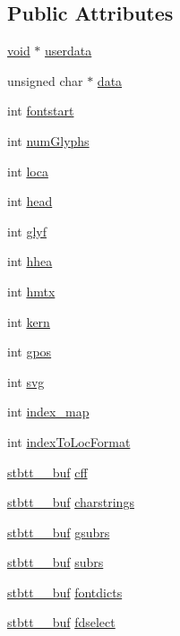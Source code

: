 \subsection*{Public Attributes}
\begin{DoxyCompactItemize}
\item 
\hyperlink{imgui__impl__opengl3__loader_8h_ac668e7cffd9e2e9cfee428b9b2f34fa7}{void} $\ast$ \hyperlink{structstbtt__fontinfo_a9c81078df96a7a3f730137151efab285}{userdata}
\item 
unsigned char $\ast$ \hyperlink{structstbtt__fontinfo_af348db379cf0e0e71a68603d00501d41}{data}
\item 
int \hyperlink{structstbtt__fontinfo_a139234d825b585afa27748a1f3d10c7d}{fontstart}
\item 
int \hyperlink{structstbtt__fontinfo_a60ad8301a98eb7cd91472ce846d9080d}{num\+Glyphs}
\item 
int \hyperlink{structstbtt__fontinfo_a15344195b181b50bde4f59ae7ca248c0}{loca}
\item 
int \hyperlink{structstbtt__fontinfo_ab76ed2f4cbd8fcbd8465ca5f88e7e2b9}{head}
\item 
int \hyperlink{structstbtt__fontinfo_a5de2129e0a415748920f6aa10ceee6e5}{glyf}
\item 
int \hyperlink{structstbtt__fontinfo_a91b82ae03d68892eb7f3fbd3a8b990e5}{hhea}
\item 
int \hyperlink{structstbtt__fontinfo_aebf42701e99b88d07a59bf99cb84b9a1}{hmtx}
\item 
int \hyperlink{structstbtt__fontinfo_a57cc83512daea60e97ed49354d634d37}{kern}
\item 
int \hyperlink{structstbtt__fontinfo_aeb6732549a55fa30235d0c0ecd743022}{gpos}
\item 
int \hyperlink{structstbtt__fontinfo_a2aae62e8e1269ab65be642a7ec82d7b3}{svg}
\item 
int \hyperlink{structstbtt__fontinfo_a0b95e3ac0c397b72b7696ce6696eb189}{index\+\_\+map}
\item 
int \hyperlink{structstbtt__fontinfo_a5fa117a7ef058111a70a5b0b87d220f4}{index\+To\+Loc\+Format}
\item 
\hyperlink{structstbtt____buf}{stbtt\+\_\+\+\_\+buf} \hyperlink{structstbtt__fontinfo_a6031b4bda94aa2b5ff07ef5d626a15a4}{cff}
\item 
\hyperlink{structstbtt____buf}{stbtt\+\_\+\+\_\+buf} \hyperlink{structstbtt__fontinfo_aaf04a69f8dd4b6a8bed4191b57145082}{charstrings}
\item 
\hyperlink{structstbtt____buf}{stbtt\+\_\+\+\_\+buf} \hyperlink{structstbtt__fontinfo_afc5bfc4a52ad0e3879f0f81a372da7fb}{gsubrs}
\item 
\hyperlink{structstbtt____buf}{stbtt\+\_\+\+\_\+buf} \hyperlink{structstbtt__fontinfo_aebc496bb1c001a8a90e0e66da16107d2}{subrs}
\item 
\hyperlink{structstbtt____buf}{stbtt\+\_\+\+\_\+buf} \hyperlink{structstbtt__fontinfo_a966c70ac9548a02fff558846fbce3677}{fontdicts}
\item 
\hyperlink{structstbtt____buf}{stbtt\+\_\+\+\_\+buf} \hyperlink{structstbtt__fontinfo_a4e06b1c29295a9aba529105e88fe1d71}{fdselect}
\end{DoxyCompactItemize}


